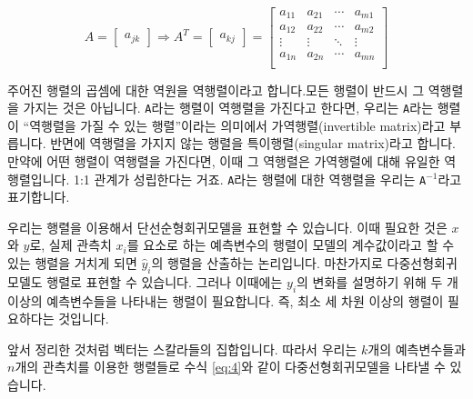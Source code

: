 \documentclass[
]{book}
\begin{document}
\begin{equation} \label{eq:3}
A = \begin{bmatrix}a_{jk}\end{bmatrix} \Rightarrow A^T = \begin{bmatrix}a_{kj}\end{bmatrix} = 
\begin{bmatrix} 
a_{11} & a_{21} & \cdots & a_{m1} \\ 
a_{12} & a_{22} & \cdots & a_{m2} \\
\vdots & \vdots & \ddots & \vdots \\
a_{1n} & a_{2n} & \cdots & a_{mn} \\ \end{bmatrix}
\end{equation}

주어진 행렬의 곱셈에 대한 역원을 역행렬이라고 합니다.모든 행렬이 반드시 그 역행렬을 가지는 것은 아닙니다. \texttt{A}라는 행렬이 역행렬을 가진다고 한다면, 우리는 \texttt{A}라는 행렬이 ``역행렬을 가질 수 있는 행렬''이라는 의미에서 가역행렬(invertible matrix)라고 부릅니다. 반면에 역행렬을 가지지 않는 행렬을 특이행렬(singular matrix)라고 합니다. 만약에 어떤 행렬이 역행렬을 가진다면, 이때 그 역행렬은 가역행렬에 대해 유일한 역행렬입니다. 1:1 관계가 성립한다는 거죠. \texttt{A}라는 행렬에 대한 역행렬을 우리는 \texttt{A}\(^{-1}\)라고 표기합니다.

우리는 행렬을 이용해서 단선순형회귀모델을 표현할 수 있습니다. 이때 필요한 것은 \(x\)와 \(y\)로, 실제 관측치 \(x_i\)를 요소로 하는 예측변수의 행렬이 모델의 계수값이라고 할 수 있는 행렬을 거치게 되면 \(\hat{y}_i\)의 행렬을 산출하는 논리입니다. 마찬가지로 다중선형회귀모델도 행렬로 표현할 수 있습니다. 그러나 이때에는 \(y_i\)의 변화를 설명하기 위해 두 개 이상의 예측변수들을 나타내는 행렬이 필요합니다. 즉, 최소 세 차원 이상의 행렬이 필요하다는 것입니다.

앞서 정리한 것처럼 벡터는 스칼라들의 집합입니다. 따라서 우리는 \(k\)개의 예측변수들과 \(n\)개의 관측치를 이용한 행렬들로 수식 \ref{eq:4}와 같이 다중선형회귀모델을 나타낼 수 있습니다.
\end{document}
